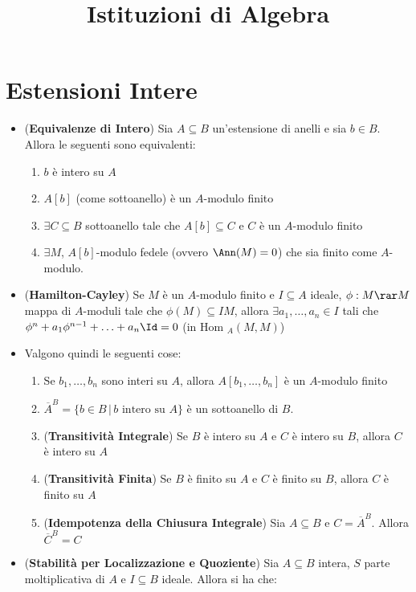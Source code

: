 \documentclass[a4paper,NoNotes,GeneralMath]{stdmdoc}
\newcommand{\pipe}{\,|\,}
\newcommand{\Hom}{\text{Hom }}
\newcommand{\intclos}[2]{\ensuremath{\overline{#1}^{#2}}}
\begin{document}
\title{Istituzioni di Algebra}

\section*{Estensioni Intere}
\begin{itemize}
\item ({\bf Equivalenze di Intero}) Sia $A \subseteq B$ un'estensione di
  anelli e sia $b \in B$. Allora le seguenti sono equivalenti:
  \begin{enumerate}
  \item $b$ è intero su $A$
  \item $A[b]$ (come sottoanello) è un $A$-modulo finito
  \item $\exists C \subseteq B$ sottoanello tale che $A[b] \subseteq
    C$ e $C$ è un $A$-modulo finito
  \item $\exists M$, $A[b]$-modulo fedele (ovvero $\Ann(M) = 0$) che
    sia finito come $A$-modulo.
  \end{enumerate}
\item ({\bf Hamilton-Cayley}) Se $M$ è un $A$-modulo finito e
  $I \subseteq A$ ideale, $\phi: M \rar M$ mappa di $A$-moduli tale che
  $\phi(M) \subseteq IM$, allora $\exists a_1, \ldots, a_n \in I$ tali
  che $\phi^n + a_1 \phi^{n-1} + \ldots + a_n \Id = 0$ (in
  $\Hom_A(M, M)$)
\item Valgono quindi le seguenti cose:
  \begin{enumerate}
  \item Se $b_1, \ldots, b_n$ sono interi su $A$, allora
    $A[b_1, \ldots, b_n]$ è un $A$-modulo finito
  \item $\intclos{A}{B} = \{ b \in B \pipe b \text{ intero su } A \}$ è un
    sottoanello di $B$.
  \item ({\bf Transitività Integrale}) Se $B$ è intero su $A$ e $C$ è
    intero su $B$, allora $C$ è intero su $A$
  \item ({\bf Transitività Finita}) Se $B$ è finito su $A$ e $C$ è
    finito su $B$, allora $C$ è finito su $A$
  \item ({\bf Idempotenza della Chiusura Integrale}) Sia $A \subseteq
    B$ e $C = \intclos{A}{B}$. Allora $\intclos{C}{B} = C$
  \end{enumerate}
\item ({\bf Stabilità per Localizzazione e Quoziente}) Sia
  $A \subseteq B$ intera, $S$ parte moltiplicativa di $A$ e
  $I \subseteq B$ ideale. Allora si ha che:
  \begin{enumerate}

\end{enumerate}
\end{itemize}
\end{document}
